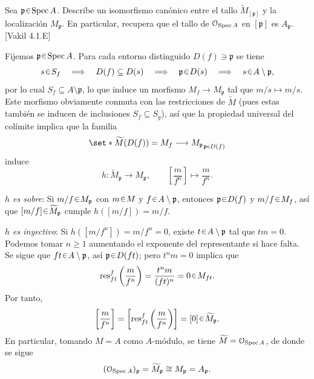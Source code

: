 \begin{ejer}\label{ejer:t3-tallo-modulo}
Sea $\mathfrak p\en\Spec A$. Describe un isomorfismo canónico entre el tallo $\widetilde M_{[\mathfrak p]}$ y la localización $M_{\mathfrak p}$. En particular, recupera que el tallo de $\mathcal O_{\operatorname{Spec} A}$ en $[\mathfrak p]$ es $A_{\mathfrak p}$. \hfill [Vakil 4.1.E]
\end{ejer}
\begin{sol}
Fijemos $\mathfrak p\en\Spec A$. Para cada entorno distinguido $D(f)\ni\mathfrak p$ se tiene
\[
s\en S_f\quad\Longrightarrow\quad D(f)\subseteq D(s)
\quad\Longrightarrow\quad\mathfrak p\en D(s)
\quad\Longrightarrow\quad s\en A\setminus\mathfrak p,
\]
por lo cual $S_f\subseteq A\setminus\mathfrak p$, lo que induce un morfismo $M_f\to M_{\mathfrak p}$ tal que $m/s\mapsto m/s$. Este morfismo obviamente conmuta con las restricciones de $\widetilde M$ (pues estas también se inducen de inclusiones $S_f\subseteq S_g$), así que la propiedad universal del colímite implica que la familia
\[
\set*{\widetilde M(D(f))=M_f\longrightarrow M_{\mathfrak p}}_{\mathfrak p\en D(f)}
\]
induce
\[
h\colon\widetilde M_{\mathfrak p}\longrightarrow M_{\mathfrak p},
\qquad\left[\frac{m}{f^n}\right]\longmapsto\frac{m}{f^n}.
\]

\medskip
\noindent\emph{$h$ es sobre}: Si $m/f\en M_{\mathfrak p}$ con $m\en M$ y $f\en A\setminus\mathfrak p$, entonces $\mathfrak p\en D(f)$ y $m/f\en M_f$, así que $[m/f]\en\widetilde M_{\mathfrak p}$ cumple $h([m/f])=m/f$.

\medskip
\noindent\emph{$h$ es inyectivo}: Si $h([m/f^n])=m/f^n=0$, existe $t\en A\setminus\mathfrak p$ tal que $tm=0$. Podemos tomar $n\ge1$ aumentando el exponente del representante si hace falta. Se sigue que $ft\en A\setminus\mathfrak p$, así $\mathfrak p\en D(ft)$; pero $t^n m=0$ implica que
\[
\res_{ft}^f\left(\frac{m}{f^n}\right)
=\frac{t^n m}{(ft)^n}=0\en M_{ft}.
\]
Por tanto,
\[
\left[\frac{m}{f^n}\right]
=\left[\res_{ft}^f\left(\frac{m}{f^n}\right)\right]
=[0]\en\widetilde M_{\mathfrak p}.
\]
En particular, tomando $M=A$ como $A$-módulo, se tiene $\widetilde M=\mathcal O_{\operatorname{Spec} A}$, de donde se sigue
\[
(\mathcal O_{\operatorname{Spec} A})_{\mathfrak p}=\widetilde M_{\mathfrak p}\cong M_{\mathfrak p}=A_{\mathfrak p}.
\]
\end{sol}
